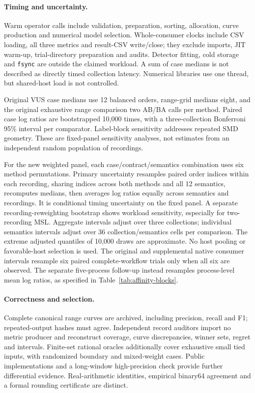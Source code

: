 \paragraph{Timing and uncertainty.}
Warm operator calls include validation, preparation, sorting, allocation,
curve production and numerical model selection. Whole-consumer clocks include
CSV loading, all three metrics and result-CSV write/close; they exclude imports,
JIT warm-up, trial-directory preparation and audits. Detector fitting, cold
storage and \texttt{fsync} are outside the claimed workload. A sum of case medians
is not described as directly timed collection latency. Numerical libraries use
one thread, but shared-host load is not controlled.

Original VUS case medians use 12 balanced orders, range-grid medians eight, and
the original exhaustive range comparison two AB/BA calls per method. Paired
case log ratios are bootstrapped 10,000 times, with a three-collection Bonferroni
95\% interval per comparator. Label-block sensitivity addresses repeated SMD
geometry. These are fixed-panel sensitivity analyses, not estimates from an
independent random population of recordings.

For the new weighted panel, each case/contract/semantics combination uses six
method permutations. Primary uncertainty resamples paired order indices within
each recording, sharing indices across both methods and all 12 semantics,
recomputes medians, then averages log ratios equally across semantics and
recordings. It is conditional timing uncertainty on the fixed panel. A separate
recording-reweighting bootstrap shows workload sensitivity, especially for
two-recording MSL. Aggregate intervals adjust over three collections; individual
semantics intervals adjust over 36 collection/semantics cells per comparison.
The extreme adjusted quantiles of 10,000 draws are approximate. No host pooling
or favorable-host selection is used. The original and supplemental native
consumer intervals resample six paired complete-workflow trials only when all
six are observed. The separate five-process follow-up instead resamples
process-level mean log ratios, as specified in Table~\ref{tab:affinity-blocks}.

\paragraph{Correctness and selection.}
Complete canonical range curves are archived, including precision, recall and
F1; repeated-output hashes must agree. Independent record auditors import no
metric producer and reconstruct coverage, curve discrepancies, winner sets,
regret and intervals. Finite-set rational oracles additionally cover exhaustive
small tied inputs, with randomized boundary and mixed-weight cases. Public
implementations and a long-window high-precision check provide further
differential evidence. Real-arithmetic identities, empirical binary64 agreement
and a formal rounding certificate are distinct.

